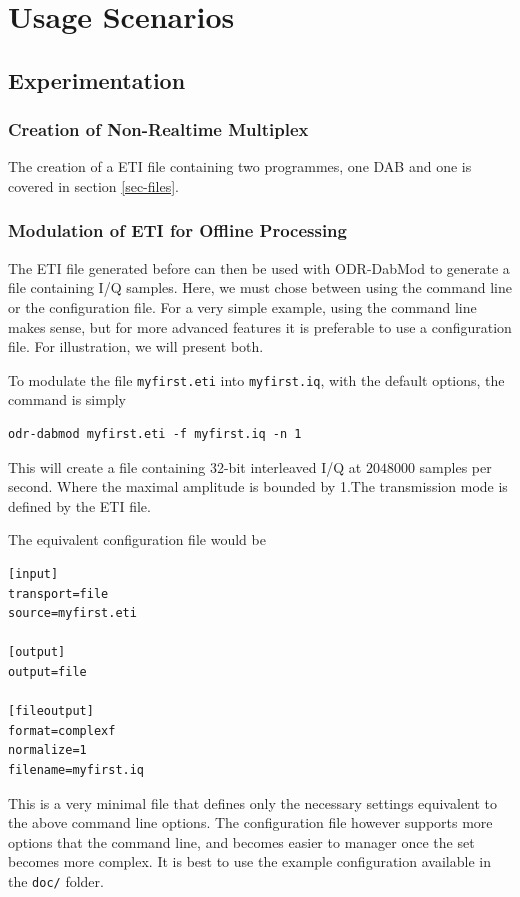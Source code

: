 \section{Usage Scenarios}
\subsection{Experimentation}
\subsubsection{Creation of Non-Realtime Multiplex}
The creation of a ETI file containing two programmes, one DAB and one
\dabplus{} is covered in section \ref{sec-files}.

\subsubsection{Modulation of ETI for Offline Processing}
The ETI file generated before can then be used with ODR-DabMod to generate a
file containing I/Q samples. Here, we must chose between using the command line
or the configuration file. For a very simple example, using the command line
makes sense, but for more advanced features it is preferable to use a
configuration file. For illustration, we will present both.

To modulate the file \texttt{myfirst.eti} into \texttt{myfirst.iq}, with the
default options, the command is simply

\begin{lstlisting}
odr-dabmod myfirst.eti -f myfirst.iq -n 1
\end{lstlisting}

This will create a file containing 32-bit interleaved I/Q at $2048000$ samples
per second. Where the maximal amplitude is bounded by 1.The transmission mode
is defined by the ETI file. 

The equivalent configuration file would be
\begin{lstlisting}
[input]
transport=file
source=myfirst.eti

[output]
output=file

[fileoutput]
format=complexf
normalize=1
filename=myfirst.iq
\end{lstlisting}

This is a very minimal file that defines only the necessary settings equivalent
to the above command line options. The configuration file however supports more
options that the command line, and becomes easier to manager once the set
becomes more complex. It is best to use the example configuration available in
the \texttt{doc/} folder.

